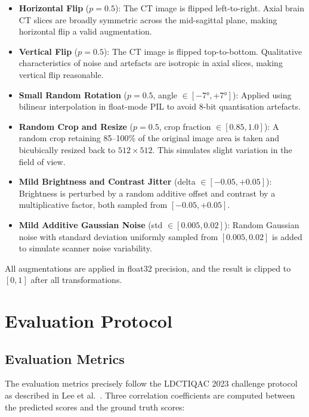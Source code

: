 \begin{itemize}
    \item \textbf{Horizontal Flip} ($p = 0.5$): The CT image is flipped left-to-right.
          Axial brain CT slices are broadly symmetric across the mid-sagittal plane,
          making horizontal flip a valid augmentation.
    \item \textbf{Vertical Flip} ($p = 0.5$): The CT image is flipped top-to-bottom.
          Qualitative characteristics of noise and artefacts are isotropic in axial
          slices, making vertical flip reasonable.
    \item \textbf{Small Random Rotation} ($p = 0.5$, angle $\in [-7°, +7°]$): Applied
          using bilinear interpolation in float-mode PIL to avoid 8-bit quantisation
          artefacts.
    \item \textbf{Random Crop and Resize} ($p = 0.5$, crop fraction $\in [0.85, 1.0]$):
          A random crop retaining 85--100\% of the original image area is taken and
          bicubically resized back to $512 \times 512$. This simulates slight variation
          in the field of view.
    \item \textbf{Mild Brightness and Contrast Jitter} (delta $\in [-0.05, +0.05]$):
          Brightness is perturbed by a random additive offset and contrast by a
          multiplicative factor, both sampled from $[-0.05, +0.05]$.
    \item \textbf{Mild Additive Gaussian Noise} (std $\in [0.005, 0.02]$): Random
          Gaussian noise with standard deviation uniformly sampled from
          $[0.005, 0.02]$ is added to simulate scanner noise variability.
\end{itemize}

All augmentations are applied in float32 precision, and the result is clipped to
$[0, 1]$ after all transformations.


\section{Evaluation Protocol}
\label{sec:evaluation}

\subsection{Evaluation Metrics}

The evaluation metrics precisely follow the LDCTIQAC 2023 challenge protocol as
described in Lee et al.\ \cite{lee2025ldctiqac}. Three correlation coefficients are
computed between the predicted scores and the ground truth scores:


